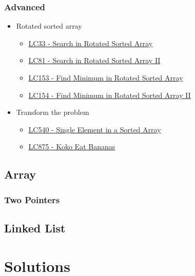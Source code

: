 \documentclass[justified]{tufte-book}
\begin{document}
\subsection{Advanced}
\begin{itemize}
    \item Rotated sorted array
    \begin{itemize}
        \item \hyperref[sec:lc33_search_rotated_sorted_array]{LC33 - Search in Rotated Sorted Array}
        \item \hyperref[sec:lc81_search_rotated_sorted_array_ii]{LC81 - Search in Rotated Sorted Array II}
        \item \hyperref[sec:lc153_find_min_rotated_sorted_array]{LC153 - Find Minimum in Rotated Sorted Array}
        \item \hyperref[sec:lc154_find_min_rotated_sorted_array_ii]{LC154 - Find Minimum in Rotated Sorted Array II}
    \end{itemize}
    
    \item Transform the problem
    \begin{itemize}
        \item \hyperref[sec:lc540_single_element_sorted_array]{LC540 - Single Element in a Sorted Array}
        \item \hyperref[sec:lc875_koko_eat_banana]{LC875 - Koko Eat Bananas}
    \end{itemize}
    
\end{itemize}

\section{Array}
\subsection{Two Pointers}

\section{Linked List}

\chapter{Solutions}
\end{document}
